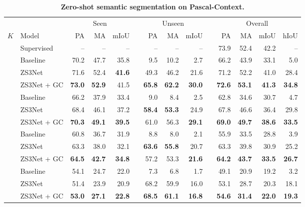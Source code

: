 \documentclass{article}
\begin{document}
\begin{table}
\caption{\small \textbf{Zero-shot semantic segmentation on Pascal-Context.}\vspace{3pt}}
\setlength{\tabcolsep}{5pt}
\small{
\begin{tabular}{clrrrrrrrrrrrr} \toprule
& & \multicolumn{3}{c}{Seen} && \multicolumn{3}{c}{Unseen} && \multicolumn{4}{c}{Overall}     \\\cline{3-5} \cline{7-9} \cline{11-14}\noalign{\smallskip}
$K$ &Model           & PA    &MA    & mIoU  && PA    & MA    & mIoU    && PA    & MA   & mIoU  & hIoU \\ \midrule[1.1pt] 
&Supervised & -- & --  & -- && -- & -- & -- && 73.9  & 52.4 & 42.2 & -- \\ \hline\noalign{\smallskip}
\multirow{4}{*}{2} & Baseline & 70.2 & 47.7 & 35.8 && 9.5 & 10.2  & 2.7 && 66.2  & 43.9 & 33.1 &5.0 \\ 
&  ZS3Net & 71.6 &  52.4  & \bf 41.6 && 49.3  &   46.2  & 21.6 &&  71.2 & 52.2 &  41.0   & 28.4\\
&  ZS3Net + GC &  \bf 73.0 & \bf 52.9  &  41.5 && \bf 65.8  \bf  &  \bf 62.2  & \bf 30.0 && \bf 72.6  & \bf 53.1 & \bf 41.3 & \bf 34.8 \\ 
\hline\noalign{\smallskip}
\multirow{4}{*}{4} & Baseline & 66.2 & 37.9  & 33.4 && 9.0 & 8.4 & 2.5 && 62.8 & 34.6 & 30.7 & 4.7 \\ 
&  ZS3Net & 68.4 & 46.1  &  37.2 && \bf 58.4  \bf  &  \bf 53.3  &  24.9  &&  67.8 &  46.6 & 36.4 &  29.8 \\
&  ZS3Net + GC & \bf 70.3 & \bf 49.1  & \bf 39.5 &&  61.0  &  56.3  & \bf 29.1 && \bf 69.0 & \bf 49.7 & \bf 38.6 & \bf  33.5  \\ 
\hline\noalign{\smallskip}
\multirow{4}{*}{6} & Baseline &  60.8 & 36.7  & 31.9 && 8.8 & 8.0 & 2.1  && 55.9  & 33.5 & 28.8 & 3.9 \\ 
&  ZS3Net  &  63.3 &  38.0  &   32.1 && \bf  63.6  &  \bf 55.8 &  20.7 &&  63.3 &  39.8 & 30.9 &  25.2\\
&  ZS3Net + GC  & \bf 64.5  & \bf 42.7   & \bf 34.8 &&  57.2 &  53.3  & \bf 21.6  && \bf 64.2 & \bf 43.7  & \bf 33.5 & \bf 26.7 \\ \hline\noalign{\smallskip}
\multirow{4}{*}{8} & Baseline & 54.1 & 24.7  & 22.0 && 7.3 & 6.8 & 1.7 && 49.1 & 20.9 & 19.2 & 3.2 \\ 
&  ZS3Net  & 51.4 &  23.9 &  20.9   &&  68.2 \bf  & 59.9 \bf  &  16.0\bf  &&  53.1 &  28.7  &  20.3 & 18.1 \\
&  ZS3Net + GC  &  \bf 53.0  & \bf 27.1  & \bf 22.8 &&  \bf 68.5  &  \bf 61.1  & \bf 16.8 && \bf  54.6 & \bf 31.4  & \bf 22.0 & \bf  19.3 \\

\end{tabular}}
\end{table}
\end{document}

